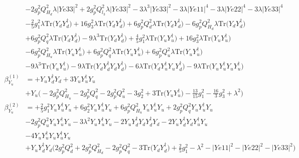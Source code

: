  \begin{align} 
 & -2 g_{p}^{2} Q_{H_d}^{2} \lambda |Ye33|^2 +2 g_{p}^{2} Q_{l_3}^{2} \lambda |Ye33|^2 -3 \lambda^{3} |Ye33|^2 -3 \lambda |Ye11|^4 -3 \lambda |Ye22|^4 -3 \lambda |Ye33|^4 \nonumber \\ 
 &-\frac{2}{5} g_{1}^{2} \lambda \mbox{Tr}\Big({Y_d  Y_{d}^{\dagger}}\Big) +16 g_{3}^{2} \lambda \mbox{Tr}\Big({Y_d  Y_{d}^{\dagger}}\Big) +6 g_{p}^{2} Q_{d}^{2} \lambda \mbox{Tr}\Big({Y_d  Y_{d}^{\dagger}}\Big) -6 g_{p}^{2} Q_{H_d}^{2} \lambda \mbox{Tr}\Big({Y_d  Y_{d}^{\dagger}}\Big) \nonumber \\ 
 &+6 g_{p}^{2} Q_{q}^{2} \lambda \mbox{Tr}\Big({Y_d  Y_{d}^{\dagger}}\Big) -9 \lambda^{3} \mbox{Tr}\Big({Y_d  Y_{d}^{\dagger}}\Big) +\frac{4}{5} g_{1}^{2} \lambda \mbox{Tr}\Big({Y_u  Y_{u}^{\dagger}}\Big) +16 g_{3}^{2} \lambda \mbox{Tr}\Big({Y_u  Y_{u}^{\dagger}}\Big) \nonumber \\ 
 &-6 g_{p}^{2} Q_{H_u}^{2} \lambda \mbox{Tr}\Big({Y_u  Y_{u}^{\dagger}}\Big) +6 g_{p}^{2} Q_{q}^{2} \lambda \mbox{Tr}\Big({Y_u  Y_{u}^{\dagger}}\Big) +6 g_{p}^{2} Q_{u}^{2} \lambda \mbox{Tr}\Big({Y_u  Y_{u}^{\dagger}}\Big) \nonumber \\ 
 &-9 \lambda^{3} \mbox{Tr}\Big({Y_u  Y_{u}^{\dagger}}\Big) -9 \lambda \mbox{Tr}\Big({Y_d  Y_{d}^{\dagger}  Y_d  Y_{d}^{\dagger}}\Big) -6 \lambda \mbox{Tr}\Big({Y_d  Y_{u}^{\dagger}  Y_u  Y_{d}^{\dagger}}\Big) -9 \lambda \mbox{Tr}\Big({Y_u  Y_{u}^{\dagger}  Y_u  Y_{u}^{\dagger}}\Big) \\ 
\beta_{Y_u}^{(1)} & =  
+{Y_u  Y_{d}^{\dagger}  Y_d}+3 {Y_u  Y_{u}^{\dagger}  Y_u} \nonumber \\ 
 &+Y_u \Big(-2 g_{p}^{2} Q_{H_u}^{2}  -2 g_{p}^{2} Q_{q}^{2}  -2 g_{p}^{2} Q_{u}^{2}  -3 g_{2}^{2}  + 3 \mbox{Tr}\Big({Y_u  Y_{u}^{\dagger}}\Big)  -\frac{13}{15} g_{1}^{2}  -\frac{16}{3} g_{3}^{2}  + \lambda^{2}\Big)\\ 
\beta_{Y_u}^{(2)} & =  
+\frac{2}{5} g_{1}^{2} {Y_u  Y_{u}^{\dagger}  Y_u} +6 g_{2}^{2} {Y_u  Y_{u}^{\dagger}  Y_u} +6 g_{p}^{2} Q_{H_u}^{2} {Y_u  Y_{u}^{\dagger}  Y_u} +2 g_{p}^{2} Q_{q}^{2} {Y_u  Y_{u}^{\dagger}  Y_u} \nonumber \\ 
 &-2 g_{p}^{2} Q_{u}^{2} {Y_u  Y_{u}^{\dagger}  Y_u} -3 \lambda^{2} {Y_u  Y_{u}^{\dagger}  Y_u} -2 {Y_u  Y_{d}^{\dagger}  Y_d  Y_{d}^{\dagger}  Y_d} -2 {Y_u  Y_{d}^{\dagger}  Y_d  Y_{u}^{\dagger}  Y_u} \nonumber \\ 
 &-4 {Y_u  Y_{u}^{\dagger}  Y_u  Y_{u}^{\dagger}  Y_u} \nonumber \\ 
 &+{Y_u  Y_{d}^{\dagger}  Y_d} \Big(2 g_{p}^{2} Q_{d}^{2}  + 2 g_{p}^{2} Q_{H_d}^{2}  -2 g_{p}^{2} Q_{q}^{2}  -3 \mbox{Tr}\Big({Y_d  Y_{d}^{\dagger}}\Big)  + \frac{2}{5} g_{1}^{2}  - \lambda^{2}  - |Ye11|^2  - |Ye22|^2  - |Ye33|^2 \Big)\nonumber \\ 

\end{align}

